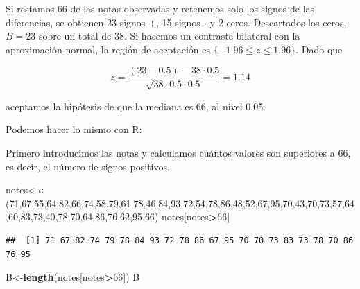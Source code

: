 \documentclass[
]{article}
\newenvironment{Shaded}{\begin{snugshade}}{\end{snugshade}}
\newcommand{\DecValTok}[1]{\textcolor[rgb]{0.00,0.00,0.81}{#1}}
\newcommand{\FunctionTok}[1]{\textcolor[rgb]{0.13,0.29,0.53}{\textbf{#1}}}
\newcommand{\NormalTok}[1]{#1}
\newcommand{\OtherTok}[1]{\textcolor[rgb]{0.56,0.35,0.01}{#1}}
\newcommand{\SpecialCharTok}[1]{\textcolor[rgb]{0.81,0.36,0.00}{\textbf{#1}}}
\begin{document}
Si restamos 66 de las notas observadas y retenemos solo los signos de las diferencias, se obtienen 23 signos +, 15 signos - y 2 ceros. Descartados los ceros, \(B=23\) sobre un total de 38. Si hacemos un contraste bilateral con la aproximación normal, la región de aceptación es \(\{-1.96 \leq z \leq 1.96\}\).
Dado que

\[
z=\frac{(23-0.5)-38 \cdot 0.5}{\sqrt{38 \cdot 0.5 \cdot 0.5}}=1.14
\]

aceptamos la hipótesis de que la mediana es 66, al nivel 0.05.

Podemos hacer lo mismo con R:

Primero introducimos las notas y calculamos cuántos valores son superiores a 66, es decir, el número de signos positivos.

\begin{Shaded}
\begin{Highlighting}[]
\NormalTok{notes}\OtherTok{\textless{}{-}}\FunctionTok{c}\NormalTok{ (}\DecValTok{71}\NormalTok{,}\DecValTok{67}\NormalTok{,}\DecValTok{55}\NormalTok{,}\DecValTok{64}\NormalTok{,}\DecValTok{82}\NormalTok{,}\DecValTok{66}\NormalTok{,}\DecValTok{74}\NormalTok{,}\DecValTok{58}\NormalTok{,}\DecValTok{79}\NormalTok{,}\DecValTok{61}\NormalTok{,}\DecValTok{78}\NormalTok{,}\DecValTok{46}\NormalTok{,}\DecValTok{84}\NormalTok{,}\DecValTok{93}\NormalTok{,}\DecValTok{72}\NormalTok{,}\DecValTok{54}\NormalTok{,}\DecValTok{78}\NormalTok{,}\DecValTok{86}\NormalTok{,}\DecValTok{48}\NormalTok{,}\DecValTok{52}\NormalTok{,}\DecValTok{67}\NormalTok{,}\DecValTok{95}\NormalTok{,}\DecValTok{70}\NormalTok{,}\DecValTok{43}\NormalTok{,}\DecValTok{70}\NormalTok{,}\DecValTok{73}\NormalTok{,}\DecValTok{57}\NormalTok{,}\DecValTok{64}\NormalTok{,}\DecValTok{60}\NormalTok{,}\DecValTok{83}\NormalTok{,}\DecValTok{73}\NormalTok{,}\DecValTok{40}\NormalTok{,}\DecValTok{78}\NormalTok{,}\DecValTok{70}\NormalTok{,}\DecValTok{64}\NormalTok{,}\DecValTok{86}\NormalTok{,}\DecValTok{76}\NormalTok{,}\DecValTok{62}\NormalTok{,}\DecValTok{95}\NormalTok{,}\DecValTok{66}\NormalTok{)}
\NormalTok{notes[notes}\SpecialCharTok{\textgreater{}}\DecValTok{66}\NormalTok{]}
\end{Highlighting}
\end{Shaded}

\begin{verbatim}
##  [1] 71 67 82 74 79 78 84 93 72 78 86 67 95 70 70 73 83 73 78 70 86 76 95
\end{verbatim}

\begin{Shaded}
\begin{Highlighting}[]
\NormalTok{B}\OtherTok{\textless{}{-}}\FunctionTok{length}\NormalTok{(notes[notes}\SpecialCharTok{\textgreater{}}\DecValTok{66}\NormalTok{])}
\NormalTok{B}
\end{Highlighting}
\end{Shaded}
\end{document}
